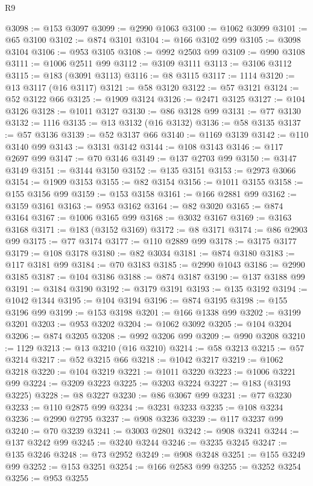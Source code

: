 \begin{lexlean}{R9}
\begin{coremodule}
@3098 := @153 @3097
@3099 := @2990 @1063
@3100 := @1062 @3099
@3101 := @65 @3100
@3102 := @874 @3101
@3104 := @166 @3102 @99
@3105 := @3098 @3104
@3106 := @953 @3105
@3108 := @992 @2503 @99
@3109 := @990 @3108
@3111 := @1006 @2511 @99
@3112 := @3109 @3111
@3113 := @3106 @3112
@3115 := @183 (@3091 @3113)
@3116 := @8 @3115
@3117 := 1114
@3120 := @13 @3117 (@16 @3117)
@3121 := @58 @3120
@3122 := @57 @3121
@3124 := @52 @3122 @66
@3125 := @1909 @3124
@3126 := @2471 @3125
@3127 := @104 @3126
@3128 := @1011 @3127
@3130 := @86 @3128 @99
@3131 := @77 @3130
@3132 := 1116
@3135 := @13 @3132 (@16 @3132)
@3136 := @58 @3135
@3137 := @57 @3136
@3139 := @52 @3137 @66
@3140 := @1169 @3139
@3142 := @110 @3140 @99
@3143 := @3131 @3142
@3144 := @108 @3143
@3146 := @117 @2697 @99
@3147 := @70 @3146
@3149 := @137 @2703 @99
@3150 := @3147 @3149
@3151 := @3144 @3150
@3152 := @135 @3151
@3153 := @2973 @3066
@3154 := @1909 @3153
@3155 := @82 @3154
@3156 := @1011 @3155
@3158 := @155 @3156 @99
@3159 := @153 @3158
@3161 := @166 @2881 @99
@3162 := @3159 @3161
@3163 := @953 @3162
@3164 := @82 @3020
@3165 := @874 @3164
@3167 := @1006 @3165 @99
@3168 := @3032 @3167
@3169 := @3163 @3168
@3171 := @183 (@3152 @3169)
@3172 := @8 @3171
@3174 := @86 @2903 @99
@3175 := @77 @3174
@3177 := @110 @2889 @99
@3178 := @3175 @3177
@3179 := @108 @3178
@3180 := @82 @3034
@3181 := @874 @3180
@3183 := @117 @3181 @99
@3184 := @70 @3183
@3185 := @2990 @1043
@3186 := @2990 @3185
@3187 := @104 @3186
@3188 := @874 @3187
@3190 := @137 @3188 @99
@3191 := @3184 @3190
@3192 := @3179 @3191
@3193 := @135 @3192
@3194 := @1042 @1344
@3195 := @104 @3194
@3196 := @874 @3195
@3198 := @155 @3196 @99
@3199 := @153 @3198
@3201 := @166 @1338 @99
@3202 := @3199 @3201
@3203 := @953 @3202
@3204 := @1062 @3092
@3205 := @104 @3204
@3206 := @874 @3205
@3208 := @992 @3206 @99
@3209 := @990 @3208
@3210 := 1129
@3213 := @13 @3210 (@16 @3210)
@3214 := @58 @3213
@3215 := @57 @3214
@3217 := @52 @3215 @66
@3218 := @1042 @3217
@3219 := @1062 @3218
@3220 := @104 @3219
@3221 := @1011 @3220
@3223 := @1006 @3221 @99
@3224 := @3209 @3223
@3225 := @3203 @3224
@3227 := @183 (@3193 @3225)
@3228 := @8 @3227
@3230 := @86 @3067 @99
@3231 := @77 @3230
@3233 := @110 @2875 @99
@3234 := @3231 @3233
@3235 := @108 @3234
@3236 := @2990 @2795
@3237 := @908 @3236
@3239 := @117 @3237 @99
@3240 := @70 @3239
@3241 := @3003 @2801
@3242 := @908 @3241
@3244 := @137 @3242 @99
@3245 := @3240 @3244
@3246 := @3235 @3245
@3247 := @135 @3246
@3248 := @73 @2952
@3249 := @908 @3248
@3251 := @155 @3249 @99
@3252 := @153 @3251
@3254 := @166 @2583 @99
@3255 := @3252 @3254
@3256 := @953 @3255

\end{coremodule}
\end{lexlean}
